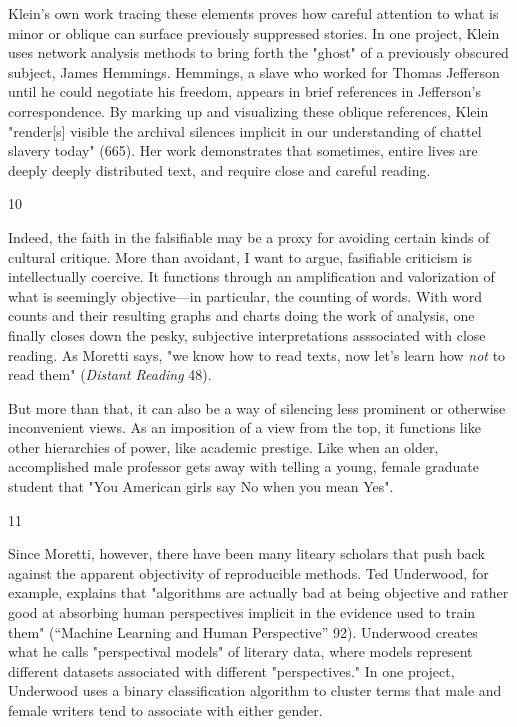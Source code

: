 \documentclass[11pt]{article}
\begin{document}
Klein's own work tracing these elements proves how careful attention
to what is minor or oblique can surface previously suppressed stories.
In one project, Klein uses network analysis methods to bring forth the
"ghost" of a previously obscured subject, James Hemmings. Hemmings, a
slave who worked for Thomas Jefferson until he could negotiate his
freedom, appears in brief references in Jefferson's correspondence. By
marking up and visualizing these oblique references, Klein "render[s]
visible the archival silences implicit in our understanding of chattel
slavery today" (665). Her work demonstrates that sometimes, entire
lives are deeply deeply distributed text, and require close and
careful reading. 

10

Indeed, the faith in the falsifiable may be a proxy for avoiding
certain kinds of cultural critique. More than avoidant, I want to
argue, fasifiable criticism is intellectually coercive. It functions
through an amplification and valorization of what is seemingly
objective---in particular, the counting of words. With word counts and
their resulting graphs and charts doing the work of analysis, one
finally closes down the pesky, subjective interpretations asssociated
with close reading. As Moretti says, "we know how to read texts, now
let's learn how \emph{not} to read them" (\emph{Distant Reading} 48).

But more than that, it can also be a way of silencing less prominent
or otherwise inconvenient views. As an imposition of a view from the
top, it functions like other hierarchies of power, like academic
prestige. Like when an older, accomplished male professor gets away
with telling a young, female graduate student that "You American girls
say No when you mean Yes".

11

Since Moretti, however, there have been many liteary scholars that
push back against the apparent objectivity of reproducible methods.
Ted Underwood, for example, explains that "algorithms are actually bad
at being objective and rather good at absorbing human perspectives
implicit in the evidence used to train them" (“Machine Learning and
Human Perspective” 92). Underwood creates what he calls "perspectival
models" of literary data, where models represent different datasets
associated with different "perspectives." In one project, Underwood
uses a binary classification algorithm to cluster terms that male and
female writers tend to associate with either gender.
\end{document}
